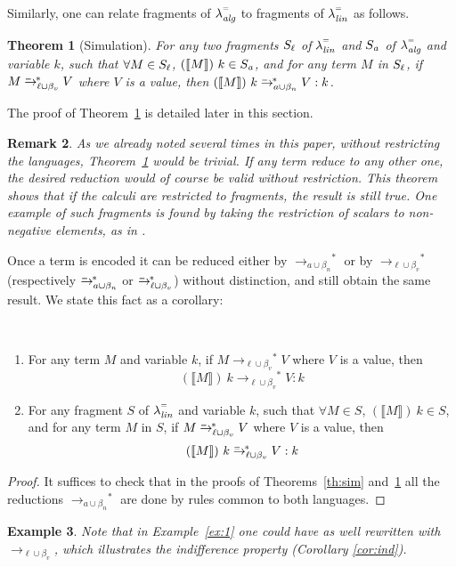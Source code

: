\documentclass{LMCS}
\newtheorem{theorem}{Theorem}[section]
\newtheorem{remark}[theorem]{Remark}
\newtheorem{example}[theorem]{Example}
\newenvironment{Corollary}{\Needspace*{3\baselineskip}\corollary
}{\endtheorem}
\newcommand{\xllin}[1]{\ensuremath{\lambda^{\raisebox{0.5ex}{\textrm{\tiny $#1$}}}_{{\it lin}}}}
\newcommand{\xlalg}[1]{\ensuremath{\lambda^{\raisebox{0.5ex}{\textrm{\tiny $#1$}}}_{{\it alg}}}}
\newcommand{\llineq}{\xllin{=}}
\newcommand{\lalgeq}{\xlalg{=}}
\newcommand{\xto}[1]{\ensuremath{\rightarrow_{#1}}}
\newcommand{\ssimxto}[1]{\ensuremath{\rightarrow_{#1}^{\hspace{-2.2ex}\textrm{\tiny=}\ *}}}
\newcommand{\toblinred}{\xto{\ell\cup\beta_v}}
\newcommand{\stoblinred}{\ensuremath{\xto{\ell\cup\beta_v}^{\ast}}}
\newcommand{\stobalgred}{\ensuremath{\xto{a\cup\beta_n}^{\ast}}}
\newcommand{\stoblineq}{\ensuremath{\ssimxto{{\ell}\cup\beta_v}}}
\newcommand{\stobalgeq}{\ensuremath{\ssimxto{a\cup\beta_n}}}
\newcommand{\wt}[1]{\llbracket{#1}\rrbracket}
\begin{document}
Similarly, one can relate fragments of $\lalgeq$ to fragments of
$\llineq$ as follows.

\begin{theorem}[Simulation]\label{th:simeq}
  For any two fragments $S_{\it \ell}$ of $\llineq$ and $S_{\it a}$ of $\lalgeq$ and variable $k$, such that $\forall M\in S_{\it \ell}$, $(\wt M)~k\in S_{\it a}$, and for any term $M$ in $S_{\it \ell}$, if $M\stoblineq V$ where $V$ is a value, then $(\wt M)~k \stobalgeq V:k$.
\end{theorem}
The proof of Theorem~\ref{th:simeq} is detailed later in this section.


\begin{remark}
  As we already noted several times in this paper, without restricting
  the languages, Theorem~\ref{th:simeq} would be trivial. If any term
  reduce to any other one, the desired reduction would of course be
  valid without restriction. This theorem shows that if the calculi
  are restricted to fragments, the result is still true.
One example of such fragments is found by taking the restriction of
  scalars to non-negative elements, as in \cite{VauxMSCS09}.
\end{remark}


Once a term is encoded it can be reduced either by $\stobalgred$ or by
$\stoblinred$ (respectively $\stobalgeq$ or $\stoblineq$) without
distinction, and still obtain the same result. 
We state this fact as a corollary:

\begin{Corollary}[Indifference]\label{cor:ind}~
  \begin{enumerate}
    \item For any term $M$ and variable $k$, if $M\stoblinred V$ where $V$ is a value, then 
      \[ (\wt M)~k \stoblinred V:k \]
    \item For any  fragment $S$ of $\llineq$ and variable $k$, such that $\forall M\in S$, $(\wt M)~k\in S$, and for any term
      $M$ in $S$, if $M\stoblineq V$ where $V$ is a value, then 
      \[ (\wt M)~k \stoblineq V:k \]
  \end{enumerate}
\end{Corollary}
\begin{proof}
  It suffices to check that in the proofs of Theorems~\ref{th:sim}
  and~\ref{th:simeq} all the reductions $\stobalgred$
  are done by rules common to both languages.
\end{proof}

\begin{example}\label{ex:1-indifference}
  Note that in Example~\ref{ex:1} one could have as well rewritten with $\toblinred$, which illustrates the indifference property (Corollary \ref{cor:ind}).
\end{example}
\end{document}
